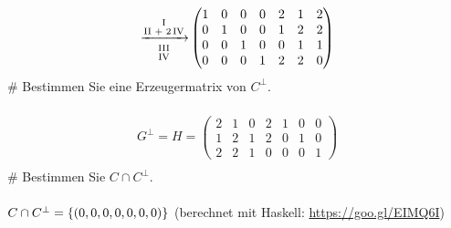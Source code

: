 \begin{myList}
\begin{align*}
\lgsto{\rom 1}{\rom 2 + 2\,\rom 4}{\rom 3}{\rom 4}&\begin{pmatrix}
  1 & 0 & 0 & 0 & 2 & 1 & 2 \\
  0 & 1 & 0 & 0 & 1 & 2 & 2 \\
  0 & 0 & 1 & 0 & 0 & 1 & 1 \\
  0 & 0 & 0 & 1 & 2 & 2 & 0 
  \end{pmatrix}\\
\end{align*}
#
Bestimmen Sie eine Erzeugermatrix von $C^\bot$.\\\\
\begin{align*}
G^\bot = H = \begin{pmatrix}
  2 & 1 & 0 & 2 & 1 & 0 & 0 \\
  1 & 2 & 1 & 2 & 0 & 1 & 0 \\
  2 & 2 & 1 & 0 & 0 & 0 & 1
  \end{pmatrix}\\
\end{align*}
#
Bestimmen Sie $C \cap C^\bot$.\\\\
$C \cap C^\bot = \left\lbrace \left( 0, 0, 0, 0, 0, 0, 0 \right) \right\rbrace$ (berechnet mit Haskell: \url{https://goo.gl/EIMQ6I})
\end{myList}
